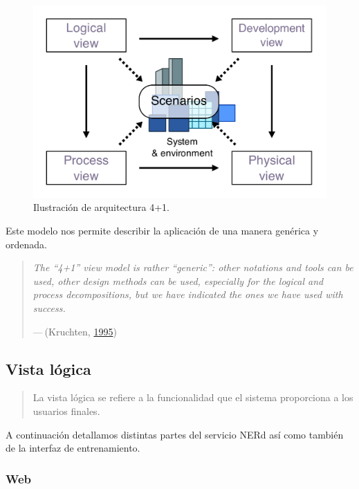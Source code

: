 \documentclass[12pt,a4paper,]{scrartcl}
\begin{document}
\begin{figure}[H]

{\centering \includegraphics{assets/4+1_Architectural_View_Model.pdf} 

}

\caption{Ilustración de arquitectura 4+1.}\label{fig:arq41}
\end{figure}

Este modelo nos permite describir la aplicación de una manera genérica y ordenada.

\begin{quote}
\emph{The \enquote{4+1} view model is rather \enquote{generic}: other notations and tools can be used, other design methods can be used, especially for the logical and process decompositions, but we have indicated the ones we have used with success.}

\hfill --- (Kruchten, \protect\hyperlink{ref-Kruchten:1995:VMA:624610.625529}{1995})
\end{quote}

\hypertarget{vista-luxf3gica}{%
\subsection{Vista lógica}\label{vista-luxf3gica}}

\begin{quote}
La vista lógica se refiere a la funcionalidad que el sistema proporciona a los usuarios finales.
\end{quote}

A continuación detallamos distintas partes del servicio NERd así como también de la interfaz de entrenamiento.

\hypertarget{web}{%
\subsubsection{Web}\label{web}}
\end{document}
